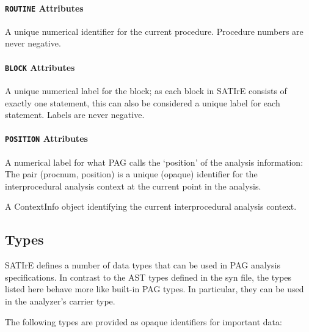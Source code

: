 \documentclass[a4paper,12pt]{report}
\begin{document}
\paragraph{\texttt{ROUTINE} Attributes}
\begin{description}
    A unique numerical identifier for the current procedure. Procedure
    numbers are never negative.
\end{description}

\paragraph{\texttt{BLOCK} Attributes}
\begin{description}
    A unique numerical label for the block; as each block in SATIrE consists
    of exactly one statement, this can also be considered a unique label for
    each statement. Labels are never negative.
\end{description}

\paragraph{\texttt{POSITION} Attributes}
\begin{description}
    A numerical label for what PAG calls the `position' of the analysis
    information: The pair (procnum, position) is a unique (opaque)
    identifier for the interprocedural analysis context at the current point
    in the analysis.

    A ContextInfo object identifying the current interprocedural analysis
    context.
\end{description}

\subsection{Types}
\label{sec:support_types}

SATIrE defines a number of data types that can be used in PAG analysis
specifications. In contrast to the AST types defined in the syn file, the
types listed here behave more like built-in PAG types. In particular, they
can be used in the analyzer's carrier type.

The following types are provided as opaque identifiers for important data:
\end{document}
